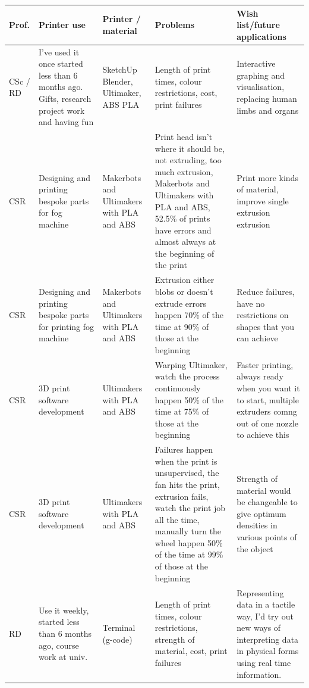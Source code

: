 \documentclass[pdftex, 11pt]{report} %
\begin{document}
\begin{longtable}{| p{1cm} | p{2.5cm} | p{2cm} | p{4cm} | p{4cm} |}
\hline


\textbf{Prof.} & \textbf{Printer use} & \textbf{Printer / material} & \textbf{Problems} & \textbf{Wish list/future applications}\\\hline

CSc / RD & I’ve used it once  started less than 6 months ago. Gifts, research project work and having fun & SketchUp Blender, Ultimaker, ABS PLA & Length of print times, colour restrictions, cost, print failures & Interactive graphing and visualisation, replacing human limbs and organs\\\hline

CSR & Designing and printing bespoke parts for fog machine & Makerbots and Ultimakers with PLA and ABS & Print head isn’t where it should be, not extruding, too much extrusion, Makerbots and Ultimakers with PLA and ABS, 52.5\% of prints have errors and almost always at the beginning of the print  & Print more kinds of material, improve single extrusion extrusion\\\hline

CSR & Designing and printing bespoke parts for printing fog machine & Makerbots and Ultimakers with PLA and ABS & Extrusion either blobs or doesn’t extrude errors happen 70\% of the time at 90\% of those at the beginning & Reduce failures, have no restrictions on shapes that you can achieve\\\hline

CSR & 3D print software development & Ultimakers with PLA and ABS & Warping Ultimaker, watch the process continuously happen 50\%
of the time at 75\% of those at the beginning & Faster printing, always ready when you want it to start, multiple extruders comng out of one nozzle to achieve this\\\hline

CSR & 3D print software development & Ultimakers with PLA and ABS & Failures happen when the print is unsupervised, the fan hits the print, extrusion fails, watch the print job all the time, manually turn the wheel happen 50\% of the time at 99\% of those at the beginning & Strength of material would be changeable to give optimum densities in various points of the object\\\hline

RD & Use it weekly, started less than 6 months ago, course work at univ. & Terminal (g-code) & Length of print times, colour restrictions, strength of material, cost, print failures & Representing data in a tactile way, I'd try out new ways of interpreting data in physical forms using real time information.\\\hline


\end{longtable}
\end{document}
